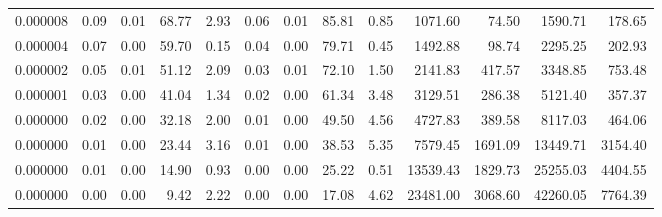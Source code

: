 \begin{tabular}{lrrrrrrrrrrrr}
0.000008 & 0.09 & 0.01 & 68.77 & 2.93 & 0.06 & 0.01 & 85.81 & 0.85 & 1071.60 & 74.50 & 1590.71 & 178.65 \\
0.000004 & 0.07 & 0.00 & 59.70 & 0.15 & 0.04 & 0.00 & 79.71 & 0.45 & 1492.88 & 98.74 & 2295.25 & 202.93 \\
0.000002 & 0.05 & 0.01 & 51.12 & 2.09 & 0.03 & 0.01 & 72.10 & 1.50 & 2141.83 & 417.57 & 3348.85 & 753.48 \\
0.000001 & 0.03 & 0.00 & 41.04 & 1.34 & 0.02 & 0.00 & 61.34 & 3.48 & 3129.51 & 286.38 & 5121.40 & 357.37 \\
0.000000 & 0.02 & 0.00 & 32.18 & 2.00 & 0.01 & 0.00 & 49.50 & 4.56 & 4727.83 & 389.58 & 8117.03 & 464.06 \\
0.000000 & 0.01 & 0.00 & 23.44 & 3.16 & 0.01 & 0.00 & 38.53 & 5.35 & 7579.45 & 1691.09 & 13449.71 & 3154.40 \\
0.000000 & 0.01 & 0.00 & 14.90 & 0.93 & 0.00 & 0.00 & 25.22 & 0.51 & 13539.43 & 1829.73 & 25255.03 & 4404.55 \\
0.000000 & 0.00 & 0.00 & 9.42 & 2.22 & 0.00 & 0.00 & 17.08 & 4.62 & 23481.00 & 3068.60 & 42260.05 & 7764.39 \\
\bottomrule
\end{tabular}
